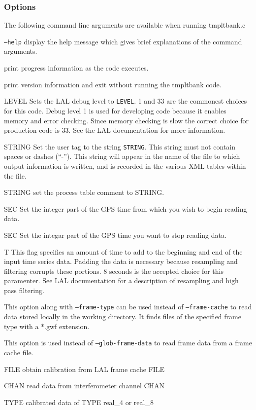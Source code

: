 \subsubsection{Options}
\noindent The following command line arguments are available when running tmpltbank.c
\\\begin{entry}
\item[\texttt{--help}] display the help message which gives brief explanations
of the command arguments.  
\item[\option{--verbose}] print progress information as the code executes.
\item[\option{--version}] print version information and exit without running 
the tmpltbank code. 
\item[\option{--debug-level} \textsc{LEVEL}] Sets the LAL debug level to \texttt{LEVEL}.  
1 and 33 are the commonest choices for this code.  Debug level 1 is used for 
developing code because it enables memory and error checking.  Since memory 
checking is slow the correct choice for production code is 33.  
See the LAL documentation for more information.  
\item[\option{--user-tag} \textsc{STRING}] Set the user tag to the string \texttt{STRING}.  
This string must not contain spaces or dashes (``-'').  This string will appear 
in the name of the file to which output information is written, and is recorded 
in the various XML tables within the file.
\item[\option{--comment} \textsc{STRING}] set the process table comment to STRING.
\item[\option{--gps-start-time} \textsc{SEC}] Set the integer part of the GPS time from 
which you wish to begin reading data.
\item[\option{--gps-end-time} \textsc{SEC}] Set the integar part of the GPS time you want
to stop reading data. 
\item[\option{--pad-data} \textsc{T}] This flag specifies an amount of time to add to 
the beginning and end of the input time series data.  Padding the data is 
necessary because resampling and filtering corrupts these portions. 
8 seconds is the accepted choice for this paramenter.  See LAL documentation 
for a description of resampling and high pass filtering.  
\item[\option{--glob-frame-data}] This option along with \texttt{--frame-type}
can be used instead of \texttt{--frame-cache} to read data stored locally in 
the working directory.  It finds files of the specified frame type with a *.gwf 
extension. 
\item[\option{--frame-cache}] This option is used instead of 
\texttt{--glob-frame-data} to read frame data from a frame cache file. 
\item[\option{--calibration-cache} \textsc{FILE}] obtain calibration from LAL frame 
cache FILE
\item[\option{--channel-name} \textsc{CHAN}] read data from interferometer channel CHAN
\item[\option{--calibrated-data} \textsc{TYPE}] calibrated data of TYPE real\_4 or real\_8


\end{entry}
